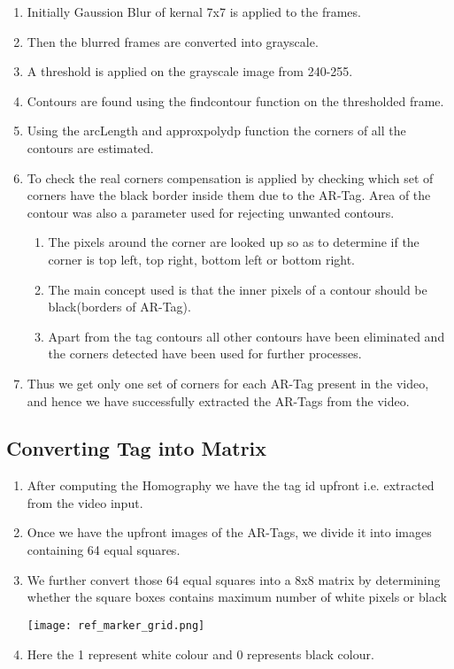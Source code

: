 \documentclass{article}
\begin{document}
\begin{enumerate}
    \item  Initially Gaussion Blur of kernal 7x7 is applied to the frames.
    \item  Then the blurred frames are converted into grayscale.
    \item  A threshold is applied on the grayscale image from 240-255.
    \item  Contours are found using the findcontour function on the thresholded frame.
    \item  Using the arcLength and approxpolydp function the corners of all the contours are estimated.
    \item  To check the real corners compensation is applied by checking which set of corners have the black
border inside them due to the AR-Tag. Area of the contour was also a parameter used for rejecting
unwanted contours.
\begin{enumerate}
\item The pixels around the corner are looked up so as to determine if the corner is top left, top right,
bottom left or bottom right.
\item The main concept used is that the inner pixels of a contour should be black(borders of AR-Tag).
\item Apart from the tag contours all other contours have been eliminated and the corners detected
have been used for further processes.
\end{enumerate}
    \item  Thus we get only one set of corners for each AR-Tag present in the video, and hence we have successfully
extracted the AR-Tags from the video.
\end{enumerate}
\subsection{Converting Tag into Matrix}
\begin{enumerate}
    \item After computing the Homography we have the tag id upfront i.e. extracted from the video input.
    \item Once we have the upfront images of the AR-Tags, we divide it into images containing 64 equal squares. 
    \item We further convert those 64 equal squares into a 8x8 matrix by determining whether the square boxes  
contains maximum number of white pixels or black
\begin{center}

    \texttt{[image: ref\_marker\_grid.png]}

    
\end{center}
    \item Here the 1 represent white colour and 0 represents black colour.
\end{enumerate}
\end{document}
